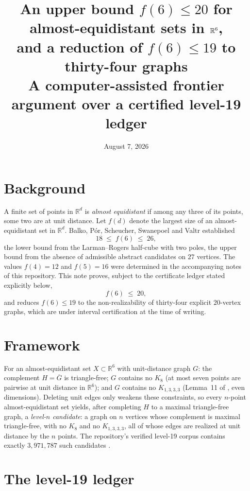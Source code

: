 \documentclass[11pt]{article}
\title{\vspace{-1.2cm}An upper bound $f(6)\le 20$ for almost-equidistant
sets in $\R^6$,\\ and a reduction of $f(6)\le 19$ to thirty-four graphs\\[4pt]
\large A computer-assisted frontier argument over a certified level-19 ledger}
\author{}
\date{August 7, 2026}
\newcommand{\R}{\mathbb{R}}
\begin{document}
\maketitle
\vspace{-1.4cm}

\section*{Background}

A finite set of points in $\R^d$ is \emph{almost equidistant} if among any
three of its points, some two are at unit distance. Let $f(d)$ denote the
largest size of an almost-equidistant set in $\R^d$. Balko, P\'or,
Scheucher, Swanepoel and Valtr \cite{BPSSV} established
\[
  18\;\le\; f(6)\;\le\; 26 ,
\]
the lower bound from the Larman--Rogers half-cube with two poles, the upper
bound from the absence of admissible abstract candidates on $27$ vertices.
The values $f(4)=12$ and $f(5)=16$ were determined in the accompanying
notes of this repository. This note proves, subject to the certificate
ledger stated explicitly below,
\[
  f(6)\;\le\;20 ,
\]
and reduces $f(6)\le 19$ to the non-realizability of thirty-four explicit
$20$-vertex graphs, which are under interval certification at the time of
writing.

\section*{Framework}

For an almost-equidistant set $X\subset\R^6$ with unit-distance graph $G$:
the complement $H=\overline G$ is triangle-free; $G$ contains no $K_8$
(at most seven points are pairwise at unit distance in $\R^6$); and $G$
contains no $K_{1,3,3,3}$ (Lemma~11 of \cite{BPSSV}, even dimensions).
Deleting unit edges only weakens these constraints, so every $n$-point
almost-equidistant set yields, after completing $H$ to a maximal
triangle-free graph, a \emph{level-$n$ candidate}: a graph on $n$ vertices
whose complement is maximal triangle-free, with no $K_8$ and no
$K_{1,3,3,3}$, all of whose edges are realized at unit distance by the
$n$ points. The repository's verified level-19 corpus contains exactly
$3{,}971{,}787$ such candidates \cite{BPSSV,thisrepo}.

\section*{The level-19 ledger}
\end{document}
